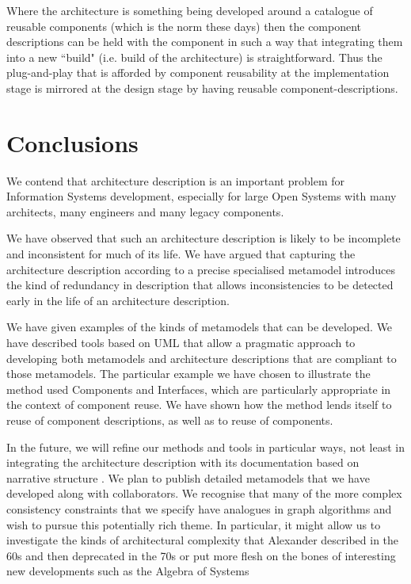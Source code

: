 \documentclass{llncs}
\begin{document}
Where the architecture is something being developed around a catalogue of reusable components (which is the norm these days) then the component descriptions can be held with the component in such a way that integrating them into a new ``build" (i.e. build of the architecture) is straightforward. Thus the plug-and-play that is afforded by component reusability at the implementation stage is mirrored at the design stage by having reusable component-descriptions.




\section{Conclusions}
\label{sec:conclusion}

\noindent We contend that architecture description is an important problem for Information Systems development, especially for large Open Systems with many architects, many engineers and many legacy components. 

We have observed that such an architecture description is likely to be incomplete and inconsistent for much of its life. We have argued that capturing the architecture description according to a precise specialised metamodel introduces the kind of redundancy in description that allows inconsistencies to be detected early in the life of an architecture description.

We have given examples of the kinds of metamodels that can be developed. We have described tools based on UML that allow a pragmatic approach to developing both metamodels and architecture descriptions that are compliant to those metamodels. The particular example we have chosen to illustrate the method used Components and Interfaces, which are particularly appropriate in the context of component reuse. We have shown how the method lends itself to reuse of component descriptions, as well as to reuse of components.

In the future, we will refine our methods and tools in particular ways, not least in integrating the architecture description with its documentation based on narrative structure \cite{Henderson3}. We plan to publish detailed metamodels that we have developed along with collaborators. We recognise that many of the more complex consistency constraints that we specify have analogues in graph algorithms and wish to pursue this potentially rich theme. In particular, it might allow us to investigate the kinds of architectural complexity that Alexander described in the 60s and then deprecated in the 70s \cite{Alexander} or put more flesh on the bones of interesting new developments such as the Algebra of Systems \cite{Koo}
\end{document}
